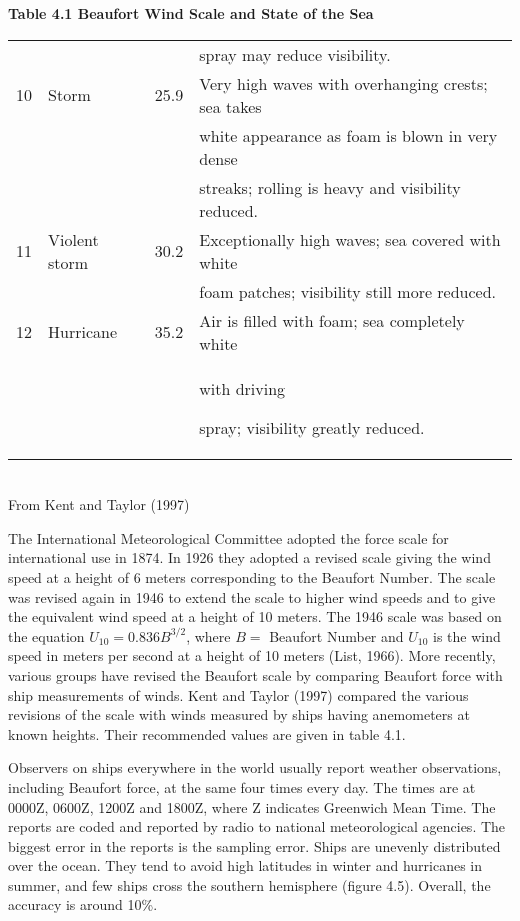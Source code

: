 \begin{table}[t!] {\textbf{\footnotesize{Table 4.1 Beaufort Wind Scale and State of the Sea}}}
\begin{footnotesize}
\begin{tabular}{@{}clrp{70mm}@{}}
\\
\ &\ &\ & \hspace{1em}spray may reduce visibility. \\
10 &    Storm &     25.9  & Very high waves with overhanging crests; sea takes \\
\ &\ &\ & \hspace{1em}white appearance as foam is blown in very dense \\
\ &\ &\ & \hspace{1em}streaks; rolling is heavy and visibility reduced. \\
11 &    Violent storm & 30.2  & Exceptionally high waves; sea covered with white \\
\ &\ &\ & \hspace{1em}foam patches; visibility still more reduced.  \\
12 &    Hurricane & 35.2  & Air is filled with foam; sea completely white\\
\ &\ &\ &  \hspace{1em}with driving  \rule[-2.5ex]{0ex}{0.5ex}spray;
visibility greatly reduced.\\
\hline
\end{tabular} \\[0.5ex]
From Kent and Taylor (1997)
\end{footnotesize}
\vspace{-4ex}
\end{table}

The International Meteorological Committee adopted the force scale for
international use in 1874. In 1926 they adopted a revised scale giving
the wind speed at a height of 6 meters corresponding to the Beaufort
Number. The scale was revised again in 1946 to extend the scale to
higher wind speeds and to give the equivalent wind speed at a height
of 10 meters. The 1946 scale was based on the equation $U_{10} = 0.836
B^{3/2}$, where $B = $ Beaufort Number and $U_{10}$ is the wind speed
in meters per second at a height of 10 meters (List, 1966). More
recently, various groups have revised the Beaufort scale by comparing
Beaufort force with ship measurements of winds. Kent and Taylor (1997)
compared the various revisions of the scale with winds measured by
ships having anemometers at known heights. Their recommended values
are given in table 4.1.

Observers on ships everywhere in the world usually report weather
observations, including Beaufort force, at the same four times every
day. The times are at 0000Z, 0600Z, 1200Z and 1800Z, where Z indicates
Greenwich Mean Time. The reports are coded and reported by radio to
national meteorological agencies. The biggest error in the reports is
the sampling error. Ships are unevenly
distributed over the ocean. They tend to avoid high latitudes in
winter and hurricanes in summer, and few ships cross the southern
hemisphere (figure 4.5). Overall, the
accuracy is around 10\%.


